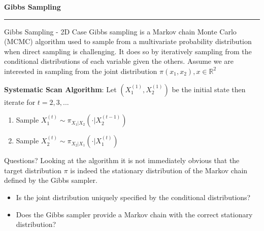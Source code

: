 \begin{frame}
	\vspace{2cm}
	\begin{center}
		{\Huge\textbf{\textcolor{copenhagenred}{Gibbs Sampling}}}
		\vspace{1cm}

		\rule{4cm}{3pt}
		\vspace{2cm}
	\end{center}
\end{frame}

\begin{frame}{Gibbs Sampling - 2D Case}
	Gibbs sampling is a Markov chain Monte Carlo (MCMC) algorithm used to sample from a
	multivariate probability distribution when direct sampling is challenging. It does so by
	iteratively sampling from the conditional distributions of each variable given the others.
	Assume we are interested in sampling from the joint distribution $\pi(x_1, x_2), x \in \mathbb{R}^2$

	\vspace{0.4cm}
	\textbf{Systematic Scan Algorithm}: Let $\left(X_1^{(1)}, X_2^{(1)}\right)$ be the initial state then iterate for $t = 2, 3, ...$

	\begin{enumerate}
		\item Sample $X_1^{(t)} \sim \pi_{X_1|X_2}\left(\cdot | X_2^{(t-1)}\right)$
		\item Sample $X_2^{(t)} \sim \pi_{X_2|X_1}\left(\cdot | X_1^{(t)}\right)$
	\end{enumerate}
\end{frame}

\begin{frame}{Questions?}
	Looking at the algorithm it is not immediately obvious that the target
	distribution $\pi$ is indeed the stationary distribution of the Markov
	chain defined by the Gibbs sampler.

	\begin{itemize}
		\item Is the joint distribution uniquely specified by the conditional distributions?
		\item Does the Gibbs sampler provide a Markov chain with the correct stationary distribution?
	\end{itemize}
\end{frame}

